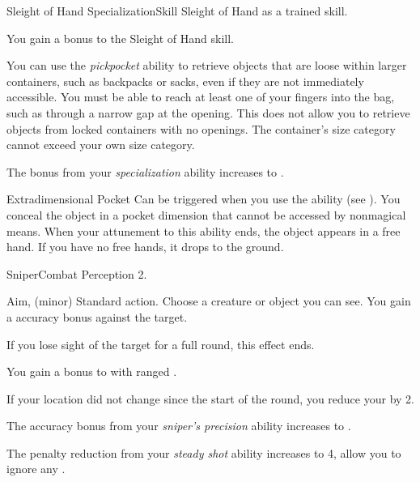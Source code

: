    \begin{feat}{Sleight of Hand Specialization}{Skill}
        \featpre Sleight of Hand as a trained skill.

         You gain a  bonus to the Sleight of Hand skill.

         You can use the \textit{pickpocket} ability to retrieve objects that are loose within larger containers, such as backpacks or sacks, even if they are not immediately accessible.
        You must be able to reach at least one of your fingers into the bag, such as through a narrow gap at the opening.
        This does not allow you to retrieve objects from locked containers with no openings.
        The container's size category cannot exceed your own size category.

         The bonus from your \textit{specialization} ability increases to .

        \begin{magicalattuneability}{Extradimensional Pocket}{}
            \abilityusagetime Can be triggered when you use the  ability (see ).
            \rankline
            You conceal the object in a pocket dimension that cannot be accessed by nonmagical means.
            When your attunement to this ability ends, the object appears in a free hand.
            If you have no free hands, it drops to the ground.
        \end{magicalattuneability}
    \end{feat}

    \begin{feat}{Sniper}{Combat}
        \featpre Perception 2.

        \begin{sustainability}{Aim}{,  (minor)}
            \abilityusagetime Standard action.
            \rankline
            Choose a creature or object you can see.
            You gain a  accuracy bonus against the target.

            If you lose sight of the target for a full round, this effect ends.
        \end{sustainability}

         You gain a  bonus to  with ranged .

         If your location did not change since the start of the round, you reduce your  by 2.

         The accuracy bonus from your \textit{sniper's precision} ability increases to .

         The penalty reduction from your \textit{steady shot} ability increases to 4, allow you to ignore any .
    \end{feat}

